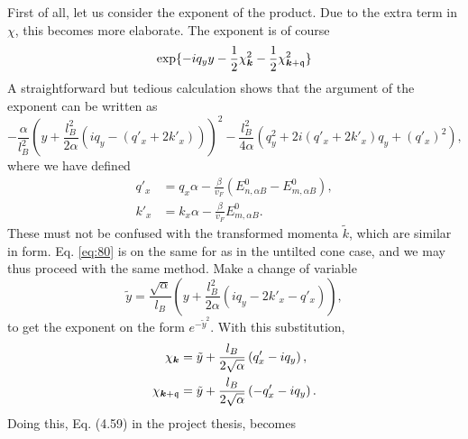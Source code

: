 First of all, let us consider the exponent of the product.
Due to the extra term in \(\chi\), this becomes more elaborate.
The exponent is of course
\begin{equation}
  \label{eq:79}
  \exp\{-i q_{y} y - \frac{1}{2} \chi_{\bm{k}} ^2 - \frac{1}{2} \chi _{\bm{k} + \mathfrak{q}}^2\}
\end{equation}
A straightforward but tedious calculation shows that the argument of the exponent can be written as
\begin{equation}
  \label{eq:80}
  -\frac{\alpha}{l_{B}^2} \left(y + \frac{l_{B}^2}{2 \alpha } (i q_{y} - (q'_x + 2 k'_x))\right)^2
  -\frac{l_{B}^2}{4 \alpha } (q_{y}^2 + 2i (q'_x + 2 k'_x) q_{y} + ( q' _{x} )^2 ),
\end{equation}
where we have defined
\begin{align}
  \label{eq:qkprime}
  q' _x &= q_x \alpha  - \frac{\beta}{v_{F} }( E^0_{n,\alpha B} - E^0_{m, \alpha B} ),\\
  k' _x &= k_x\alpha - \frac{\beta}{v_F } E^0_{m, \alpha B}.
\end{align}
These must not be confused with the transformed momenta \( \tilde{k} \), which are similar in form.
Eq. \eqref{eq:80} is on the same for as in the untilted cone case, and we may thus proceed with the same method.
Make a change of variable
\[
\tilde{y} = \frac{\sqrt{\alpha }}{l_{B}} \left(y + \frac{l_{B}^2}{2\alpha } (iq_{y} - 2 k' _x - q' _x )\right),
\]
to get the exponent on the form \(e^{-\tilde{y}^2}\).
With this substitution,
\begin{align}
  \chi _{\bm{k}} &= \tilde{y} + \frac{l_{B}}{2 \sqrt{\alpha }} \left(q' _x - i q_{y}\right),\\
  \chi _{\bm{k} + \mathfrak{q}} &= \tilde{y} + \frac{l_{B}}{2 \sqrt{\alpha }} \left(- q' _x - i q_{y}\right).
\end{align}
Doing this, Eq. (4.59)  in the project thesis, becomes
